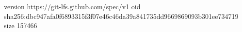 version https://git-lfs.github.com/spec/v1
oid sha256:dbc947afa0f6893315f3f07e46c46da39a841735dd9669869093b301ee734719
size 157466
